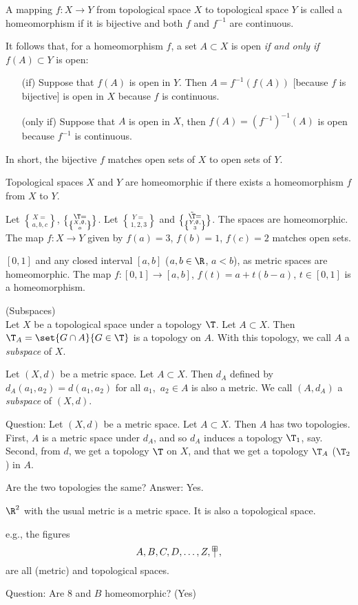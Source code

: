  A mapping $f\colon X\to Y$ from topological space $X$ to topological space $Y$ is called a homeomorphism if it is bijective and both $f$ and $f^{-1}$ are continuous.

It follows that, for a homeomorphism $f$, a set $A\subset X$ is open \emph{if and only if} $f(A)\subset Y$ is open:
\begin{itemize}
\item[(if)] Suppose that $f(A)$ is open in $Y$.  Then $A=f^{-1}(f(A))$ [because $f$ is bijective]
 is open in $X$ because $f$ is continuous.
\item[(only if)] Suppose that $A$ is open in $X$, then $f(A)=(f^{-1})^{-1}(A)$ is open because $f^{-1}$ is continuous.%
\end{itemize}
In short, the bijective $f$ matches open sets of $X$ to open sets of $Y$.

 Topological spaces $X$ and $Y$ are homeomorphic if there exists a homeomorphism $f$ from $X$ to $Y$.

\eg Let $X=\brace{a,b,c}$, $\T=\brace{X,\emptyset,\brace{a}}$.  Let $Y=\brace{1,2,3}$ and $\tilde\T=\brace{Y,\emptyset,\brace{3}}$.  The spaces are homeomorphic.  The map $f\colon X\to Y$ given by $f(a)=3$, $f(b)=1$, $f(c)=2$ matches open sets.

\eg $[0,1]$ and any closed interval $[a,b]$ ($a,b\in\R$, $a<b$), as metric spaces are homeomorphic.  The map $f\colon[0,1]\to[a,b]$, $f(t)=a+t(b-a)$, $t\in[0,1]$ is a homeomorphism.

 (Subspaces) \\
Let $X$ be a topological space under a topology $\T$.  Let $A\subset X$.  Then $\T_A=\set{G\cap A}{G\in\T}$ is a topology on $A$.  With this topology, we call $A$ a \emph{subspace} of $X$.

Let $(X,d)$ be a metric space.  Let $A\subset X$.  Then $d_A$ defined by $d_A(a_1,a_2)=d(a_1,a_2)$ for all $a_1$,~$a_2\in A$ is also a metric.  We call $(A,d_A)$ a \emph{subspace} of $(X,d)$.

Question: Let $(X,d)$ be a metric space.  Let $A\subset X$.  Then $A$ has two topologies.  First, $A$ is a metric space under $d_A$, and so $d_A$ induces a topology $\T_1$, say.  Second, from $d$, we get a topology $\T$ on $X$, and that we get a topology $\T_A$ ($\T_2$) in $A$.

Are the two topologies the same?  Answer: Yes.

\egs $\R^2$ with the usual metric is a metric space.  It is also a topological space.

e.g., the figures
\[ A, B, C, D, \dotsc, Z, \mathord{\makebox[-1.05pt][l]{$^\boxplus$}{}\mid{}}, \]%
are all (metric) and topological spaces.

Question: Are $8$ and $B$ homeomorphic? (Yes)
